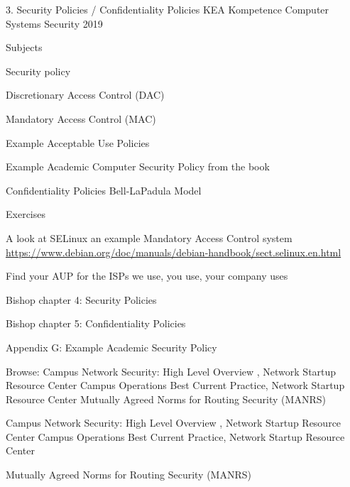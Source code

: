 \documentclass[Screen16to9,17pt]{foils}
\begin{document}
\mytitlepage
{3. Security Policies / Confidentiality Policies}
{KEA Kompetence Computer Systems Security 2019}



\begin{list1}
\item Subjects
\begin{list2}
  \item Security policy
  \item Discretionary Access Control (DAC)
  \item Mandatory Access Control (MAC)
  \item Example Acceptable Use Policies
  \item Example Academic Computer Security Policy from the book
  \item Confidentiality Policies Bell-LaPadula Model
\end{list2}
\item Exercises
\begin{list2}
\item A look at SELinux an example Mandatory Access Control system \url{https://www.debian.org/doc/manuals/debian-handbook/sect.selinux.en.html}
\item Find your AUP for the ISPs we use, you use, your company uses
\end{list2}
\end{list1}


\begin{list1}
\item Bishop chapter 4: Security Policies
\item Bishop chapter 5: Confidentiality Policies
\item Appendix G: Example Academic Security Policy
\item Browse: Campus Network Security: High Level Overview , Network Startup Resource Center Campus Operations Best Current Practice, Network Startup Resource Center Mutually Agreed Norms for Routing Security (MANRS)
\end{list1}















 Campus Network Security: High Level Overview , Network Startup Resource Center Campus Operations Best Current Practice, Network Startup Resource Center


 Mutually Agreed Norms for Routing Security (MANRS)




\slidenext
\end{document}
